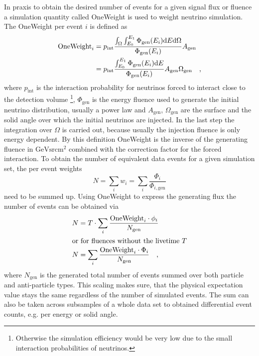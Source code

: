 In praxis to obtain the desired number of events for a given signal flux or fluence a simulation quantity called OneWeight is used to weight neutrino simulation.
The OneWeight per event $i$ is defined as 
\begin{align}
  \text{OneWeight}_i
  &= p_\text{int}\frac{\int_\Omega\int_{E_0}^{E_1}
                       \Phi_\text{gen}(E_i)\mathrm{d}E\mathrm{d}\Omega
                       }{\Phi_\text{gen}(E_i)}A_\text{gen} \\
  &= p_\text{int}\frac{\int_{E_0}^{E_1}\Phi_\text{gen}(E_i)\mathrm{d}E}
                      {\Phi_\text{gen}(E_i)}
    A_\text{gen}\Omega_\text{gen}
  \quad\text{,}
\end{align}
where $p_\text{int}$ is the interaction probability for neutrinos forced to interact close to the detection volume \footnote{Otherwise the simulation efficiency would be very low due to the small interaction probabilities of neutrinos.}, $\Phi_\text{gen}$ is the energy fluence used to generate the initial neutrino distribution, usually a power law and $A_\text{gen}$, $\Omega_\text{gen}$ are the surface and the solid angle over which the initial neutrinos are injected.
In the last step the integration over $\Omega$ is carried out, because usually the injection fluence is only energy dependent.
By this definition OneWeight is the inverse of the generating fluence in $\si{\GeV\steradian\cm\squared}$ combined with the correction factor for the forced interaction.
To obtain the number of equivalent data events for a given simulation set, the per event weights
\begin{equation}
  N = \sum_i w_i = \sum_i \frac{\Phi_i}{\Phi_{i,\text{gen}}}
\end{equation}
need to be summed up.
Using OneWeight to express the generating flux the number of events can be obtained via
\begin{align}
  N &= T \cdot \sum_i \frac{\text{OneWeight}_i \cdot \phi_i}{N_\text{gen}} \\
  \intertext{or for fluences without the livetime $T$}
  N &= \sum_i \frac{\text{OneWeight}_i \cdot \Phi_i}{N_\text{gen}}
  \quad\text{,}
\end{align}
where $N_\text{gen}$ is the generated total number of events summed over both particle and anti-particle types.
This scaling makes sure, that the physical expectation value stays the same regardless of the number of simulated events.
The sum can also be taken across subsamples of a whole data set to obtained differential event counts, e.g. per energy or solid angle.

